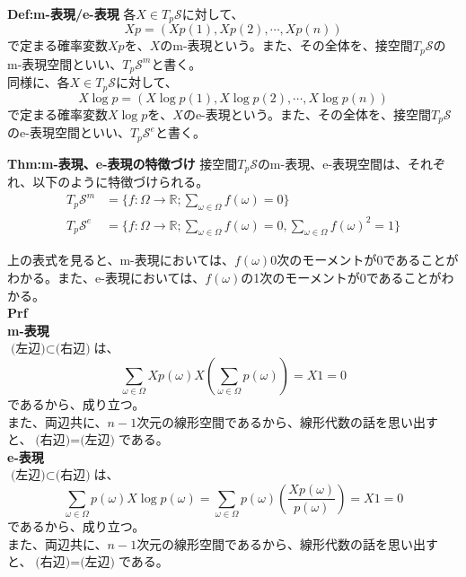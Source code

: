 \documentclass[a4paper,11pt]{jsarticle}
\numberwithin{equation}{section}
\begin{document}
\begin{itembox}[l]{\textbf{Def:m-表現/e-表現}}
    各$X \in T_p \mathcal{S}$に対して、
    \begin{equation}
        Xp = (Xp(1),Xp(2),\cdots,Xp(n))
    \end{equation}
    で定まる確率変数$Xp$を、$X$のm-表現という。また、その全体を、接空間$T_p \mathcal{S}$のm-表現空間といい、$T_p \mathcal{S}^m$と書く。\\
    同様に、各$X \in T_p \mathcal{S}$に対して、
    \begin{equation}
        X\log p = (X\log p(1),X\log p(2),\cdots,X\log p(n))
    \end{equation}
    で定まる確率変数$X\log p$を、$X$のe-表現という。また、その全体を、接空間$T_p \mathcal{S}$のe-表現空間といい、$T_p \mathcal{S}^e$と書く。
\end{itembox}

\begin{itembox}[l]{\textbf{Thm:m-表現、e-表現の特徴づけ}}
    接空間$T_p \mathcal{S}$のm-表現、e-表現空間は、それぞれ、以下のように特徴づけられる。
    \begin{align}
        T_p \mathcal{S}^m &= \{f : \Omega \to \mathbb{R}; \sum_{\omega \in \Omega} f(\omega) = 0\}\\
        T_p \mathcal{S}^e &= \{f : \Omega \to \mathbb{R}; \sum_{\omega \in \Omega} f(\omega) = 0, \sum_{\omega \in \Omega} f(\omega)^2 = 1\}
    \end{align}
\end{itembox}
上の表式を見ると、m-表現においては、$f(\omega)$0次のモーメントが0であることがわかる。また、e-表現においては、$f(\omega)$の1次のモーメントが0であることがわかる。\\
\textbf{Prf}\\
\textbf{m-表現}\\
$\text{(左辺)} \subset \text{(右辺)}$は、
\begin{equation}
    \sum_{\omega \in \Omega} Xp(\omega) X\left(\sum_{\omega \in \Omega} p(\omega)\right) = X1 = 0
\end{equation}
であるから、成り立つ。\\
また、両辺共に、$n-1$次元の線形空間であるから、線形代数の話を思い出すと、$\text{(右辺)} = \text{(左辺)}$である。\\

\textbf{e-表現}\\
$\text{(左辺)} \subset \text{(右辺)}$は、
\begin{equation}
    \sum_{\omega \in \Omega} p(\omega) X\log p(\omega) =\sum_{\omega \in \Omega} p(\omega) \left(\frac{Xp(\omega)}{p(\omega)}\right) = X1 = 0
\end{equation}
であるから、成り立つ。\\
また、両辺共に、$n-1$次元の線形空間であるから、線形代数の話を思い出すと、$\text{(右辺)} = \text{(左辺)}$である。\\
\hfill\qedsymbol\\
\end{document}
